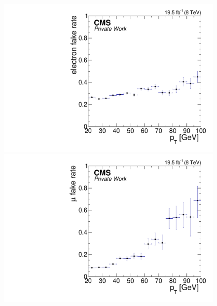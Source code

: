 \begin{figure}[tbp]
\centering
\begin{minipage}[t]{0.49\textwidth}
  \includegraphics[width=\textwidth]{plots/BG/nonPrompt/fakeRate_ele_Inclusive_Full2012_TrailingPt_range100.pdf}
\end{minipage}
\begin{minipage}[t]{0.49\textwidth}
\includegraphics[width=\textwidth]{plots/BG/nonPrompt/fakeRate_mu_Inclusive_Full2012_TrailingPt_range100.pdf}
\end{minipage}
\begin{minipage}[t]{0.49\textwidth}

\end{minipage}
\end{figure}
